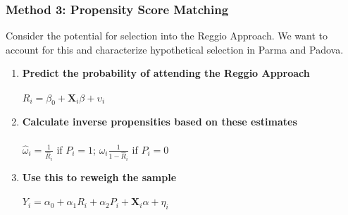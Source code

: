 \begin{frame} \frametitle{Method 3: Propensity Score Matching}
Consider the potential for selection into the Reggio Approach. We want to account for this and characterize hypothetical selection in Parma and Padova.

\begin{enumerate}
\item \textbf{Predict the probability of attending the Reggio Approach} \\
 \\
$R_i = \beta_0 + \textbf{X}_i\beta + \upsilon_{i}$
\item \textbf{Calculate inverse propensities based on these estimates} \\
 \\
$\hat{\omega}_i = \frac{1}{\hat{R}_i}$ if $P_i =1$; $\hat{\omega}_i\frac{1}{1-\hat{R}_i}$ if $P_i = 0$
\item \textbf{Use this to reweigh the sample} \\
 \\
$Y_i = \alpha_0 + \alpha_1 R_i + \alpha_2 P_i + \textbf{X}_i\alpha + \eta_{i}$
\end{enumerate}

\end{frame}